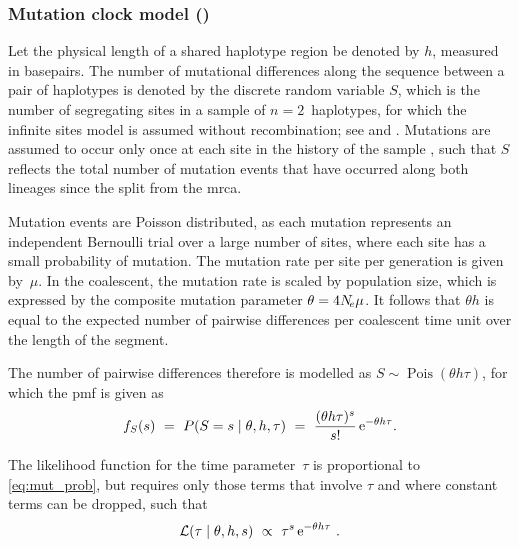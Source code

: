 %
\subsubsection{Mutation clock model (\ClockM)}\label{sec:mut_clock}
%


Let the physical length of a shared haplotype region be denoted by $h$, measured in basepairs.
The number of mutational differences along the sequence between a pair of haplotypes is denoted by the discrete random variable $S$, which is the number of segregating sites in a sample of ${n=2}$~haplotypes, for which the infinite sites model is assumed without recombination; \eg see \citet{Watterson:1975ur} and \citet{Tavare:1997vra}.
Mutations are assumed to occur only once at each site in the history of the sample \citep{Kimura:1969tn}, such that $S$ reflects the total number of mutation events that have occurred along both lineages since the split from the \gls{mrca}.

Mutation events are Poisson distributed, as each mutation represents an independent Bernoulli trial over a large number of sites, where each site has a small probability of mutation.
The mutation rate per site per generation is given by~$\mu$.
In the coalescent, the mutation rate is scaled by population size, which is expressed by the composite mutation parameter ${\theta = 4N_{\!e}\mu}$.
It follows that ${\theta h}$ is equal to the expected number of pairwise differences per coalescent time unit over the length of the segment.

The number of pairwise differences therefore is modelled as ${S \sim \operatorname{Pois}(\theta h \tau)}$, for which the \gls{pmf} is given as
\begin{equation}\label{eq:mut_prob}
	f_S(s)~=~P(S=s \mid \theta,h,\tau) ~=~ \frac{(\theta h \tau)^s}{s!} \,\mathrm{e}^{-\theta h \tau}\text{.}
\end{equation}

The likelihood function for the time parameter~$\tau$ is proportional to \cref{eq:mut_prob}, but requires only those terms that involve $\tau$ and where constant terms can be dropped, such that
\begin{equation}\label{eq:mut_like}
	\mathcal{L}(\tau \mid \theta,h,s) ~\propto~ \tau^s \,\mathrm{e}^{-\theta h \tau}\ .
\end{equation}

